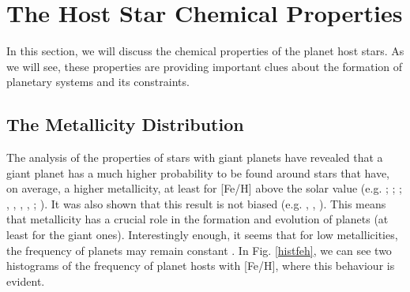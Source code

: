 \documentclass[dvips,12pt,a4paper]{report}
\begin{document}
\section{The Host Star Chemical Properties}

In this section, we will discuss the chemical properties of the planet host stars. As we will see, these properties are providing important clues about the formation of planetary systems and its constraints.

\subsection {The Metallicity Distribution} 
\label{metal}
The analysis of the properties of stars with giant planets have revealed that a giant planet has a much higher probability to be found around stars that have, on average, a higher metallicity, at least for [Fe/H] above the solar value (e.g. \citeauthor{Gonzalez-1998} \citeyear{Gonzalez-1998}; \citeauthor{Gonzalez-2001} \citeyear{Gonzalez-2001}; \citeauthor{Laws-2003} \citeyear{Laws-2003}; \citeauthor{Santos-2001a} \citeyear{Santos-2001b}, \citeyear{Santos-2001a}, \citeyear{Santos-2003}, \citeyear{Santos-2004b}, \citeyear{Santos-2005a}; \citeauthor{Fischer-2005} \citeyear{Fischer-2005}). It was also shown that this result is not biased  (e.g. \citeauthor{Santos-2003} \citeyear{Santos-2003}, \citeyear{Santos-2004b}, \citeauthor{Fischer-2005} \citeyear{Fischer-2005}). This means that metallicity has a crucial role in the formation and evolution of planets (at least for the giant ones). Interestingly enough, it seems that for low metallicities, the frequency of planets may remain constant \citep{Santos-2004b}. In Fig. \ref{histfeh}, we can see two histograms of the frequency of planet hosts with [Fe/H], where this behaviour is evident.
\end{document}
